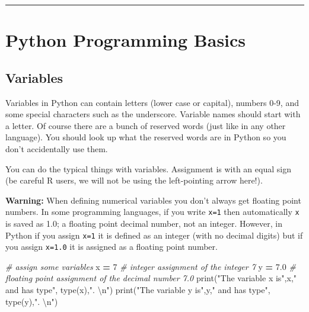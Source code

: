 \documentclass[
]{book}
\newenvironment{Shaded}{\begin{snugshade}}{\end{snugshade}}
\newcommand{\BuiltInTok}[1]{#1}
\newcommand{\CharTok}[1]{\textcolor[rgb]{0.31,0.60,0.02}{#1}}
\newcommand{\CommentTok}[1]{\textcolor[rgb]{0.56,0.35,0.01}{\textit{#1}}}
\newcommand{\DecValTok}[1]{\textcolor[rgb]{0.00,0.00,0.81}{#1}}
\newcommand{\FloatTok}[1]{\textcolor[rgb]{0.00,0.00,0.81}{#1}}
\newcommand{\NormalTok}[1]{#1}
\newcommand{\OperatorTok}[1]{\textcolor[rgb]{0.81,0.36,0.00}{\textbf{#1}}}
\newcommand{\StringTok}[1]{\textcolor[rgb]{0.31,0.60,0.02}{#1}}
\theoremstyle{definition}
\theoremstyle{definition}
\theoremstyle{definition}
\theoremstyle{remark}
\begin{document}
\begin{center}\rule{0.5\linewidth}{0.5pt}\end{center}

\hypertarget{python-programming-basics}{%
\section{Python Programming Basics}\label{python-programming-basics}}

\hypertarget{variables}{%
\subsection{Variables}\label{variables}}

Variables in Python can contain letters (lower case or capital), numbers 0-9, and some special characters such as the underscore. Variable names should start with a letter. Of course there are a bunch of reserved words (just like in any other language). You should look up what the reserved words are in Python so you don't accidentally use them.

You can do the typical things with variables. Assignment is with an equal sign (be careful R users, we will not be using the left-pointing arrow here!).

\textbf{Warning:} When defining numerical variables you don't always get floating point numbers. In some programming languages, if you write \texttt{x=1} then automatically \texttt{x} is saved as 1.0; a floating point decimal number, not an integer. However, in Python if you assign \texttt{x=1} it is defined as an integer (with no decimal digits) but if you assign \texttt{x=1.0} it is assigned as a floating point number.

\begin{Shaded}
\begin{Highlighting}[]
\CommentTok{\# assign some variables}
\NormalTok{x }\OperatorTok{=} \DecValTok{7} \CommentTok{\# integer assignment of the integer 7}
\NormalTok{y }\OperatorTok{=} \FloatTok{7.0} \CommentTok{\# floating point assignment of the decimal number 7.0}
\BuiltInTok{print}\NormalTok{(}\StringTok{"The variable x is"}\NormalTok{,x,}\StringTok{" and has type"}\NormalTok{, }\BuiltInTok{type}\NormalTok{(x),}\StringTok{". }\CharTok{\textbackslash{}n}\StringTok{"}\NormalTok{)}
\BuiltInTok{print}\NormalTok{(}\StringTok{"The variable y is"}\NormalTok{,y,}\StringTok{" and has type"}\NormalTok{, }\BuiltInTok{type}\NormalTok{(y),}\StringTok{". }\CharTok{\textbackslash{}n}\StringTok{"}\NormalTok{)}
\end{Highlighting}
\end{Shaded}
\end{document}
